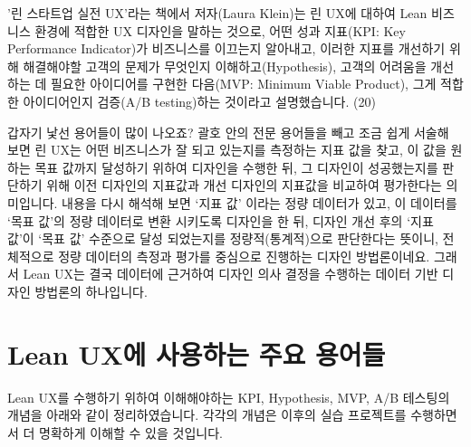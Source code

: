 \documentclass[
  letterpaper,
]{book}
\begin{document}
'린 스타트업 실전 UX'라는 책에서 저자(Laura Klein)는 린 UX에 대하여 Lean
비즈니스 환경에 적합한 UX 디자인을 말하는 것으로, 어떤 성과 지표(KPI:
Key Performance Indicator)가 비즈니스를 이끄는지 알아내고, 이러한 지표를
개선하기 위해 해결해야할 고객의 문제가 무엇인지 이해하고(Hypothesis),
고객의 어려움을 개선하는 데 필요한 아이디어를 구현한 다음(MVP: Minimum
Viable Product), 그게 적합한 아이디어인지 검증(A/B testing)하는 것이라고
설명했습니다. (20)

갑자기 낯선 용어들이 많이 나오죠? 괄호 안의 전문 용어들을 빼고 조금 쉽게
서술해 보면 린 UX는 어떤 비즈니스가 잘 되고 있는지를 측정하는 지표 값을
찾고, 이 값을 원하는 목표 값까지 달성하기 위하여 디자인을 수행한 뒤, 그
디자인이 성공했는지를 판단하기 위해 이전 디자인의 지표값과 개선 디자인의
지표값을 비교하여 평가한다는 의미입니다. 내용을 다시 해석해 보면 `지표
값' 이라는 정량 데이터가 있고, 이 데이터를 `목표 값'의 정량 데이터로
변환 시키도록 디자인을 한 뒤, 디자인 개선 후의 `지표 값'이 `목표 값'
수준으로 달성 되었는지를 정량적(통계적)으로 판단한다는 뜻이니,
전체적으로 정량 데이터의 측정과 평가를 중심으로 진행하는 디자인
방법론이네요. 그래서 Lean UX는 결국 데이터에 근거하여 디자인 의사 결정을
수행하는 데이터 기반 디자인 방법론의 하나입니다.

\section{Lean UX에 사용하는 주요
용어들}\label{lean-uxuxc5d0-uxc0acuxc6a9uxd558uxb294-uxc8fcuxc694-uxc6a9uxc5b4uxb4e4}

Lean UX를 수행하기 위하여 이해해야하는 KPI, Hypothesis, MVP, A/B
테스팅의 개념을 아래와 같이 정리하였습니다. 각각의 개념은 이후의 실습
프로젝트를 수행하면서 더 명확하게 이해할 수 있을 것입니다.
\end{document}
